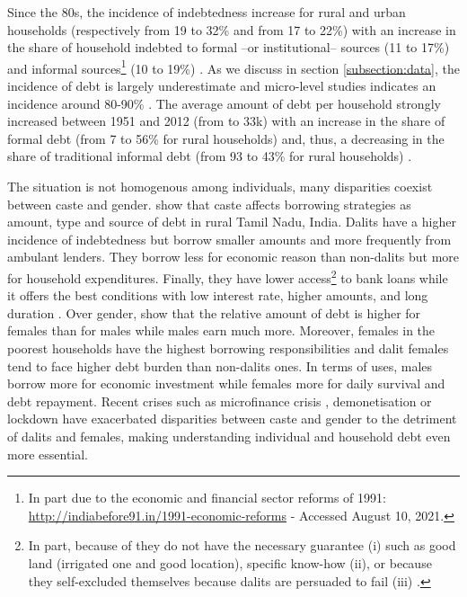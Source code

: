 \documentclass[a4paper, 12pt, onecolumn]{article}
\begin{document}
Since the 80s, the incidence of indebtedness increase for rural and urban households (respectively from 19 to 32\% and from 17 to 22\%) with an increase in the share of household indebted to formal --or institutional-- sources (11 to 17\%) and informal sources\footnote{In part due to the economic and financial sector reforms of 1991: \url{http://indiabefore91.in/1991-economic-reforms} - Accessed August 10, 2021.} (10 to 19\%) \citep{Rajakumar2019}.
As we discuss in section \ref{subsection:data}, the incidence of debt is largely underestimate \citep{Jones1994} and micro-level studies indicates an incidence around 80-90\% \citep{Guerin2013a, Jones1994, Dreze1997, Reboul2021}.
The average amount of debt per household strongly increased between 1951 and 2012 (from  to \rupee33k) with an increase in the share of formal debt (from 7 to 56\% for rural households) and, thus, a decreasing in the share of traditional informal debt (from 93 to 43\% for rural households) \citep{Rajakumar2019}.

The situation is not homogenous among individuals, many disparities coexist between caste and gender.
\cite{Guerin2013a} show that caste affects borrowing strategies as amount, type and source of debt in rural Tamil Nadu, India.
Dalits have a higher incidence of indebtedness but borrow smaller amounts and more frequently from ambulant lenders.
They borrow less for economic reason than non-dalits but more for household expenditures. %
Finally, they have lower access\footnote{In part, because of they do not have the necessary guarantee (i) such as good land (irrigated one and good location), specific know-how (ii), or because they self-excluded themselves because dalits are persuaded to fail (iii) \citep{Guerin2013a}.} to bank loans while it offers the best conditions with low interest rate, higher amounts, and long duration \citep{Chavan2007}.
Over gender, \cite{Reboul2021} show that the relative amount of debt is higher for females than for males while males earn much more.
Moreover, females in the poorest households have the highest borrowing responsibilities and dalit females tend to face higher debt burden than non-dalits ones.
In terms of uses, males borrow more for economic investment while females more for daily survival and debt repayment.
Recent crises such as microfinance crisis \citep{Nair2011, Sriram2010}, demonetisation \citep{GuerinDemo2017} or lockdown \citep{Guerin2021, Guerin2021b} have exacerbated disparities between caste and gender to the detriment of dalits and females, making understanding individual and household debt even more essential.
\end{document}
